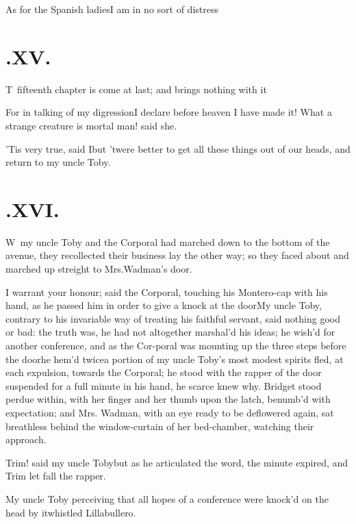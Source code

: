 \documentclass{article}
\begin{document}
As for the Spanish ladies\tsh I am in no sort of
distress\tsh

\newpage
\section{.\enspace XV.}

\lettrine{T}{\,} fifteenth chapter is come at
last; and brings nothing with it 

For in talking of my digression\tsh\break I declare before
heaven I have made it! What a strange creature is mortal man! said
she.

’Tis very true, said I\tsh but ’twere
better to get all these things out of our heads, and return to my
uncle Toby.

\newpage
\section{.\enspace XVI.}

\lettrine{W}{\,} my uncle Toby and the\break
Corporal had marched down to the bottom of the avenue, they
{recollect}\-ed their business lay the other way; so they faced about
and marched up streight to Mrs.\@ Wadman’s door.

I warrant your honour; said the Corporal, touching his Montero-cap with his
hand, as he passed him in order to give a knock at the door\tsh My uncle Toby,
contrary to his invariable way of treating his faithful servant, said nothing good
or bad: the truth was, he had not altogether marshal’d his ideas; he wish’d for
another conference, and as the Cor-\pb poral was mounting up the three steps before the
door\tsk he hem’d twice\tsk a portion of my uncle Toby’s most modest spirits fled, at
each expulsion, towards the Corporal; he stood with the rapper of the door suspended
for a full minute in his hand, he scarce knew why.  Bridget stood perdue within,
with her finger and her thumb upon the latch, benumb’d with expectation; and Mrs.\@
Wadman, with an eye ready to be deflowered again, sat breathless behind the
window-curtain of her bed-chamber, watching their approach.

Trim! said my uncle Toby\tsh but as he
articulated the word, the minute expired, and Trim let fall
the rapper.

\newpage
My uncle Toby perceiving that all hopes of a conference
were knock’d on the head by it\tsh whistled
Lillabullero.
\end{document}
